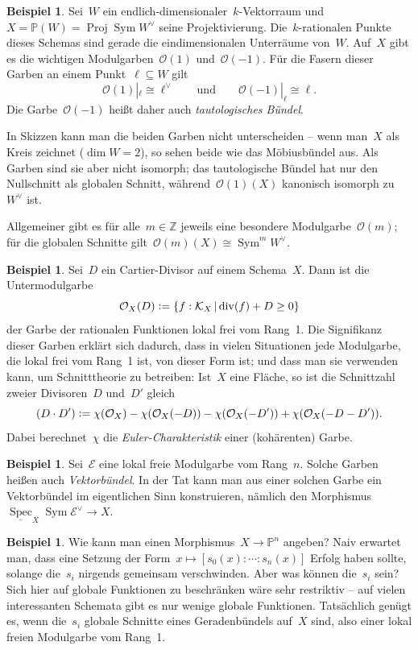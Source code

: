 \documentclass[a4paper,ngerman,12pt]{scrartcl}
\theoremstyle{definition}
\newtheorem{ex}[defn]{Beispiel}
\theoremstyle{plain}
\theoremstyle{remark}
\newcommand{\ZZ}{\mathbb{Z}}
\newcommand{\PP}{\mathbb{P}}
\newcommand{\E}{\mathcal{E}}
\newcommand{\K}{\mathcal{K}}
\renewcommand{\O}{\mathcal{O}}
\newcommand{\ul}[1]{\underline{#1}}
\DeclareMathOperator{\Spec}{Spec}
\DeclareMathOperator{\Proj}{Proj}
\DeclareMathOperator{\Sym}{Sym}
\newcommand{\defeq}{\vcentcolon=}
\begin{document}
\begin{ex}Sei~$W$ ein endlich-dimensionaler~$k$-Vektorraum und~$X = \PP(W) =
\Proj \Sym W^\vee$ seine Projektivierung. Die~$k$-rationalen Punkte dieses
Schemas sind gerade die eindimensionalen Unterräume von~$W$. Auf~$X$ gibt es
die wichtigen Modulgarben~$\O(1)$ und~$\O(-1)$. Für die Fasern dieser Garben an
einem Punkt~$\ell \subseteq W$ gilt
\[ \O(1)|_\ell \cong \ell^\vee \qquad\text{und}\qquad \O(-1)|_\ell \cong \ell. \]
Die Garbe~$\O(-1)$ heißt daher auch \emph{tautologisches Bündel}.

In Skizzen kann man die beiden Garben nicht unterscheiden -- wenn man~$X$ als
Kreis zeichnet ($\dim W = 2$), so sehen beide wie das Möbiusbündel aus. Als
Garben sind sie aber nicht isomorph; das tautologische Bündel hat nur den
Nullschnitt als globalen Schnitt, während~$\O(1)(X)$ kanonisch isomorph
zu~$W^\vee$ ist.

Allgemeiner gibt es für alle~$m \in \ZZ$ jeweils eine besondere
Modulgarbe~$\O(m)$; für die globalen Schnitte gilt~$\O(m)(X) \cong \Sym^m
W^\vee$.\end{ex}

\begin{ex}Sei~$D$ ein Cartier-Divisor auf einem Schema~$X$. Dann ist die
Untermodulgarbe
\[ \O_X(D) \defeq \{ f : \K_X \,|\, \mathrm{div}(f) + D \geq 0 \} \]
der Garbe der rationalen Funktionen lokal frei vom Rang~1. Die Signifikanz
dieser Garben erklärt sich dadurch, dass in vielen Situationen jede Modulgarbe,
die lokal frei vom Rang~1 ist, von dieser Form ist; und dass man sie verwenden
kann, um Schnitttheorie zu betreiben: Ist~$X$ eine Fläche, so ist die
Schnittzahl zweier Divisoren~$D$ und~$D'$ gleich
\[ (D \cdot D') \defeq \chi(\O_X) - \chi(\O_X(-D)) - \chi(\O_X(-D')) + \chi(\O_X(-D-D')). \]
Dabei berechnet~$\chi$ die \emph{Euler-Charakteristik} einer (kohärenten)
Garbe.
\end{ex}

\begin{ex}Sei~$\E$ eine lokal freie Modulgarbe vom Rang~$n$. Solche Garben
heißen auch \emph{Vektorbündel}. In der Tat kann man aus einer solchen Garbe
ein Vektorbündel im eigentlichen Sinn konstruieren, nämlich den
Morphismus~$\ul{\Spec}_X \Sym \E^\vee \to X$.\end{ex}

\begin{ex}Wie kann man einen Morphismus~$X \to \PP^n$ angeben? Naiv erwartet
man, dass eine Setzung der Form~$x \mapsto [s_0(x) : \cdots : s_n(x)]$ Erfolg
haben sollte, solange die~$s_i$ nirgends gemeinsam verschwinden. Aber was
können die~$s_i$ sein? Sich hier auf globale Funktionen zu beschränken wäre
sehr restriktiv -- auf vielen interessanten Schemata gibt es nur wenige globale
Funktionen. Tatsächlich genügt es, wenn die~$s_i$ globale Schnitte eines
Geradenbündels auf~$X$ sind, also einer lokal freien Modulgarbe vom Rang~1.\end{ex}
\end{document}
